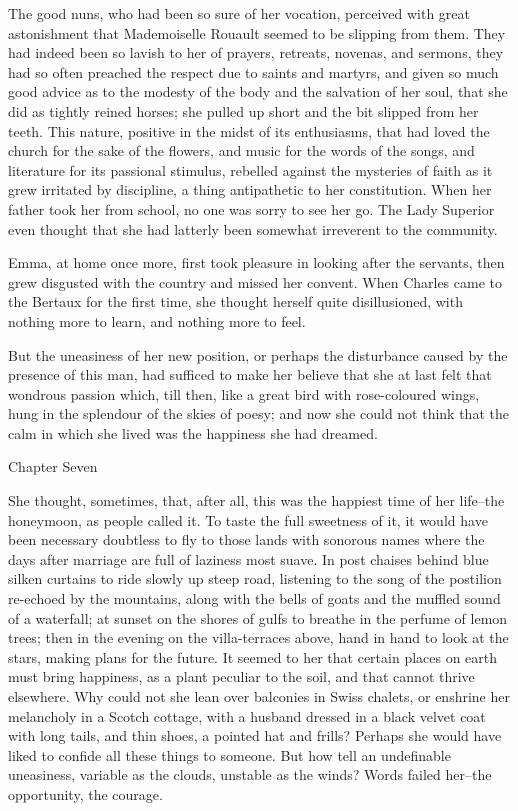 \documentclass[11pt,twocolumn]{ltugboat}
\begin{document}
The good nuns, who had been so sure of her vocation, perceived with
great astonishment that Mademoiselle Rouault seemed to be slipping
from them. They had indeed been so lavish to her of prayers, retreats,
novenas, and sermons, they had so often preached the respect due to
saints and martyrs, and given so much good advice as to the modesty of
the body and the salvation of her soul, that she did as tightly reined
horses; she pulled up short and the bit slipped from her teeth. This
nature, positive in the midst of its enthusiasms, that had loved the
church for the sake of the flowers, and music for the words of the
songs, and literature for its passional stimulus, rebelled against
the mysteries of faith as it grew irritated by discipline, a thing
antipathetic to her constitution. When her father took her from school,
no one was sorry to see her go. The Lady Superior even thought that she
had latterly been somewhat irreverent to the community.

Emma, at home once more, first took pleasure in looking after the
servants, then grew disgusted with the country and missed her convent.
When Charles came to the Bertaux for the first time, she thought herself
quite disillusioned, with nothing more to learn, and nothing more to
feel.

But the uneasiness of her new position, or perhaps the disturbance
caused by the presence of this man, had sufficed to make her believe
that she at last felt that wondrous passion which, till then, like a
great bird with rose-coloured wings, hung in the splendour of the skies
of poesy; and now she could not think that the calm in which she lived
was the happiness she had dreamed.



Chapter Seven

She thought, sometimes, that, after all, this was the happiest time
of her life--the honeymoon, as people called it. To taste the full
sweetness of it, it would have been necessary doubtless to fly to those
lands with sonorous names where the days after marriage are full of
laziness most suave. In post chaises behind blue silken curtains to ride
slowly up steep road, listening to the song of the postilion re-echoed
by the mountains, along with the bells of goats and the muffled sound of
a waterfall; at sunset on the shores of gulfs to breathe in the perfume
of lemon trees; then in the evening on the villa-terraces above, hand in
hand to look at the stars, making plans for the future. It seemed to her
that certain places on earth must bring happiness, as a plant peculiar
to the soil, and that cannot thrive elsewhere. Why could not she lean
over balconies in Swiss chalets, or enshrine her melancholy in a Scotch
cottage, with a husband dressed in a black velvet coat with long tails,
and thin shoes, a pointed hat and frills? Perhaps she would have liked
to confide all these things to someone. But how tell an undefinable
uneasiness, variable as the clouds, unstable as the winds? Words failed
her--the opportunity, the courage.
\end{document}
